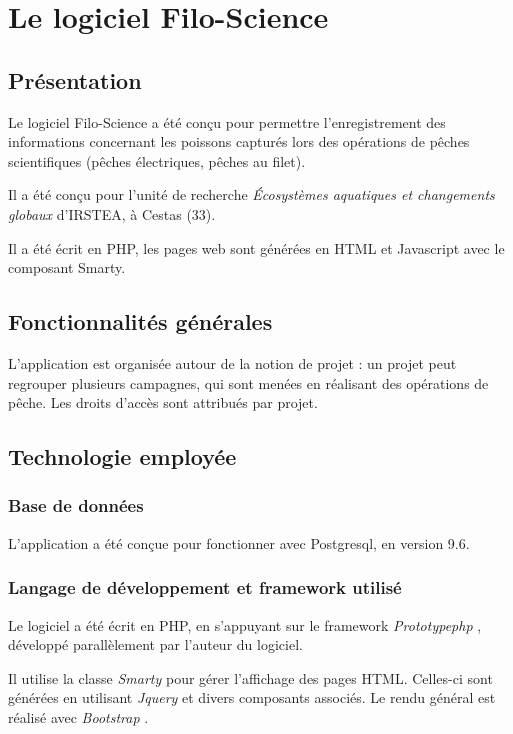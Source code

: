 \chapter{Le logiciel Filo-Science}
\section{Présentation}

Le logiciel Filo-Science a été conçu pour permettre l'enregistrement des informations concernant les poissons capturés lors des opérations de pêches scientifiques (pêches électriques, pêches au filet). 

Il a été conçu pour l'unité de recherche \textit{Écosystèmes aquatiques et changements globaux} d'IRSTEA, à Cestas (33).

Il a été écrit en PHP, les pages web sont générées en HTML et Javascript avec le composant Smarty.

\section{Fonctionnalités générales}

L'application est organisée autour de la notion de projet : un projet peut regrouper plusieurs campagnes, qui sont menées en réalisant des opérations de pêche. Les droits d'accès sont attribués par projet.

\section{Technologie employée}
\subsection{Base de données}

L'application a été conçue pour fonctionner avec Postgresql, en version 9.6. 

\subsection{Langage de développement et framework utilisé}
Le logiciel a été écrit en PHP, en s'appuyant sur le framework \textit{Prototypephp} \cite{prototypephp}, développé parallèlement par l'auteur du logiciel.

Il utilise la classe \textit{Smarty} \cite{smarty} pour gérer l'affichage des pages HTML. Celles-ci sont générées en utilisant \textit{Jquery} \cite{jquery}  et divers composants associés. Le rendu général est réalisé avec \textit{Bootstrap} \cite{bootstrap}.



